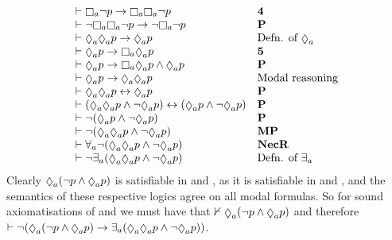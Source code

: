 $$
\begin{array}{ll}
    \proves \necessaryA \lnot \atomP \implies \necessaryA \necessaryA \lnot \atomP & {\bf 4}\\
    \proves \lnot \necessaryA \necessaryA \lnot \atomP \implies \lnot \necessaryA \lnot \atomP & {\bf P}\\
    \proves \possibleA \possibleA \atomP \implies \possibleA \atomP & \text{Defn. of $\possibleA$}\\
    \proves \possibleA \atomP \implies \necessaryA \possibleA \atomP & {\bf 5}\\
    \proves \possibleA \atomP \implies \necessaryA \possibleA \atomP \land \possibleA \atomP & {\bf P}\\
    \proves \possibleA \atomP \implies \possibleA \possibleA \atomP & \text{Modal reasoning}\\
    \proves \possibleA \possibleA \atomP \iff \possibleA \atomP & {\bf P}\\
    \proves (\possibleA \possibleA \atomP \land \lnot \possibleA \atomP) \iff (\possibleA \atomP \land \lnot \possibleA \atomP) & {\bf P}\\
    \proves \lnot (\possibleA \atomP \land \lnot \possibleA \atomP) & {\bf P}\\
    \proves \lnot (\possibleA \possibleA \atomP \land \lnot \possibleA \atomP) & {\bf MP}\\
    \proves \allrefsA \lnot (\possibleA \possibleA \atomP \land \lnot \possibleA \atomP) & {\bf NecR}\\
    \proves \lnot \somerefsA (\possibleA \possibleA \atomP \land \lnot \possibleA \atomP) & \text{Defn. of $\somerefsA$}
\end{array}
$$
Clearly $\possibleA (\lnot \atomP \land \possibleA \atomP)$ is satisfiable in \logicRmlKFF{} and \logicRmlKD{}, as it is satisfiable in \logicKFF{} and \logicKD{}, and the semantics of these respective logics agree on all modal formulas.
So for sound axiomatisations of \logicRmlKFF{} and \logicRmlKD{} we must have that $\nproves \possibleA (\lnot \atomP \land \possibleA \atomP)$ and therefore $\proves \lnot (\possibleA (\lnot \atomP \land \possibleA \atomP) \implies \somerefsA (\possibleA \possibleA \atomP \land \lnot \possibleA \atomP))$.


